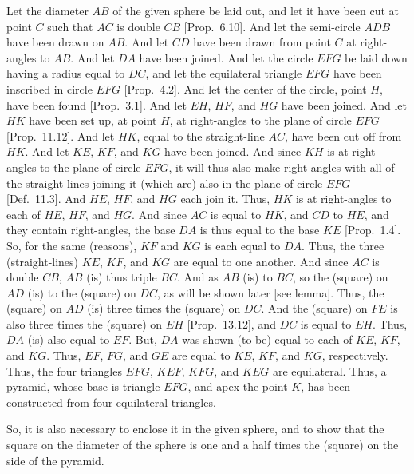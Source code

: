 \begin{Parallel}{}{}
{\epsfysize=3.5in
\centerline{}

Let the diameter $AB$ of the given sphere be laid out, and let it have been
cut at point $C$ such that $AC$ is double $CB$ [Prop.~6.10]. And let the semi-circle 
$ADB$  have been drawn on $AB$. And let $CD$ have been drawn from point
$C$ at right-angles to $AB$. And let $DA$ have been joined. 
And let the circle $EFG$ be laid down having a radius equal to $DC$,
and let the equilateral triangle $EFG$ have been inscribed in circle
$EFG$ [Prop.~4.2]. And let the center of the circle, point $H$,
have been found [Prop.~3.1]. And let $EH$, $HF$, and $HG$ have been
joined. And let $HK$ have been set up, at point $H$, at right-angles to the
plane of circle $EFG$ [Prop.~11.12]. And let $HK$, equal to the straight-line $AC$, have been cut off from $HK$. And let $KE$, $KF$, and $KG$ have been joined.
And since $KH$ is at right-angles to the plane of circle $EFG$, it will
thus also make right-angles with all of the straight-lines joining it
(which are) also in the plane of circle $EFG$ [Def.~11.3]. And $HE$, $HF$,
and $HG$ each join it. Thus, $HK$ is at right-angles to each of $HE$,
$HF$, and $HG$. And since  $AC$ is equal to $HK$, and $CD$ to
$HE$, and they contain right-angles, the base $DA$ is thus equal to the base 
$KE$ [Prop.~1.4]. So, for the same (reasons),  $KF$ and
$KG$ is each equal to $DA$. Thus, the three (straight-lines)
$KE$, $KF$, and $KG$ are equal to one another. And since 
$AC$ is double $CB$, $AB$ (is) thus triple $BC$. And as 
$AB$ (is) to $BC$, so the (square) on $AD$ (is) to the (square)
on $DC$, as will be shown later [see lemma]. Thus, the (square)
on $AD$ (is) three times the (square) on $DC$. And the (square)
on $FE$ is also three times the (square) on $EH$ [Prop.~13.12], 
and $DC$ is equal to $EH$. Thus, $DA$ (is) also equal to $EF$.
But, $DA$ was shown (to be) equal to each of $KE$, $KF$, and
$KG$. Thus, $EF$, $FG$, and $GE$ are equal to 
$KE$, $KF$, and $KG$, respectively. Thus, the four triangles $EFG$, $KEF$,
$KFG$, and $KEG$ are equilateral. Thus, a pyramid, whose base is triangle
$EFG$, and apex the point $K$,   has been
constructed from four equilateral triangles.

So, it is also necessary to enclose it in the given sphere, and to show that
the square on the diameter of the sphere is one and a half times the (square)
on the side of the pyramid. 

}
\end{Parallel}
